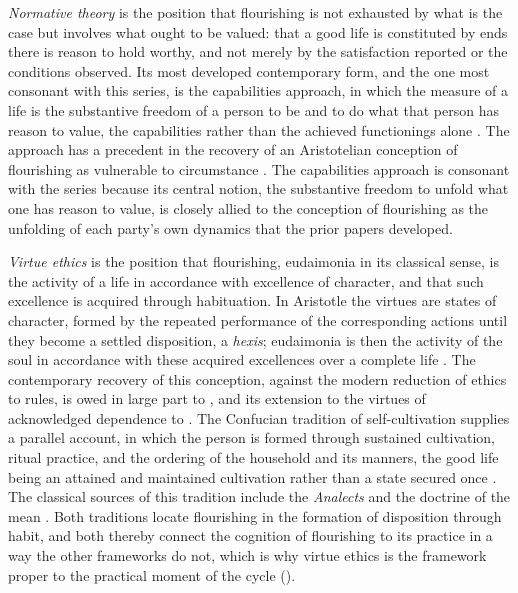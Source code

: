 \emph{Normative theory} is the position that flourishing is not exhausted by what is the case but involves what ought to be valued: that a good life is constituted by ends there is reason to hold worthy, and not merely by the satisfaction reported or the conditions observed. Its most developed contemporary form, and the one most consonant with this series, is the capabilities approach, in which the measure of a life is the substantive freedom of a person to be and to do what that person has reason to value, the capabilities rather than the achieved functionings alone \parencite{sen1999,nussbaum2011}. The approach has a precedent in the recovery of an Aristotelian conception of flourishing as vulnerable to circumstance \parencite{nussbaum1986fragility}. The capabilities approach is consonant with the series because its central notion, the substantive freedom to unfold what one has reason to value, is closely allied to the conception of flourishing as the unfolding of each party's own dynamics that the prior papers developed.

\emph{Virtue ethics} is the position that flourishing, eudaimonia in its classical sense, is the activity of a life in accordance with excellence of character, and that such excellence is acquired through habituation. In Aristotle the virtues are states of character, formed by the repeated performance of the corresponding actions until they become a settled disposition, a \emph{hexis}; eudaimonia is then the activity of the soul in accordance with these acquired excellences over a complete life \parencite{aristotle2009}. The contemporary recovery of this conception, against the modern reduction of ethics to rules, is owed in large part to \textcite{macintyre1981}, and its extension to the virtues of acknowledged dependence to \textcite{macintyre1999}. The Confucian tradition of self-cultivation supplies a parallel account, in which the person is formed through sustained cultivation, ritual practice, and the ordering of the household and its manners, the good life being an attained and maintained cultivation rather than a state secured once \parencite{tu1985}. The classical sources of this tradition include the \emph{Analects} \parencite{confucius_analects} and the doctrine of the mean \parencite{zhongyong}. Both traditions locate flourishing in the formation of disposition through habit, and both thereby connect the cognition of flourishing to its practice in a way the other frameworks do not, which is why virtue ethics is the framework proper to the practical moment of the cycle ().

